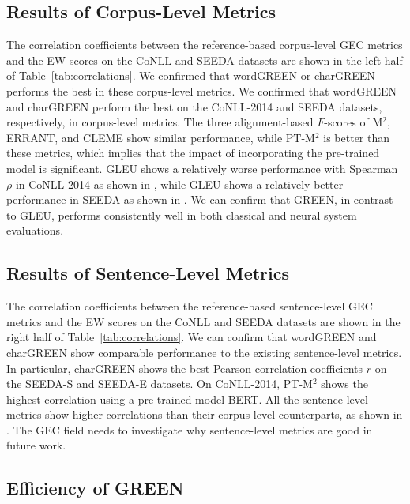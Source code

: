 \documentclass[11pt]{article}
\begin{document}
\subsection{Results of Corpus-Level Metrics}
\label{sec:corpus_level_evaluation}

The correlation coefficients between the reference-based corpus-level GEC metrics and the EW scores on the CoNLL and SEEDA datasets are shown in the left half of Table~\ref{tab:correlations}.
We confirmed that wordGREEN or charGREEN performs the best in these corpus-level metrics.
We confirmed that wordGREEN and charGREEN perform the best on the CoNLL-2014 and SEEDA datasets, respectively, in corpus-level metrics.
The three alignment-based $F$-scores of M${}^2$, ERRANT, and CLEME show similar performance, while PT-M${}^2$ is better than these metrics, which implies that the impact of incorporating the pre-trained model is significant.
GLEU shows a relatively worse performance with Spearman $\rho$ in CoNLL-2014 as shown in \citet{chollampatt-ng-2018-reassessment}, while GLEU shows a relatively better performance in SEEDA as shown in \citet{10.1162/tacl_a_00676}.
We can confirm that GREEN, in contrast to GLEU, performs consistently well in both classical and neural system evaluations.

\subsection{Results of Sentence-Level Metrics}
\label{sec:sentence_level_evaluation}

The correlation coefficients between the reference-based sentence-level GEC metrics and the EW scores on the CoNLL and SEEDA datasets are shown in the right half of Table~\ref{tab:correlations}.
We can confirm that wordGREEN and charGREEN show comparable performance to the existing sentence-level metrics.
In particular, charGREEN shows the best Pearson correlation coefficients $r$ on the SEEDA-S and SEEDA-E datasets.
On CoNLL-2014, PT-M${}^2$ shows the highest correlation using a pre-trained model BERT.
All the sentence-level metrics show higher correlations than their corpus-level counterparts, as shown in \citet{napoles-etal-2016-theres}.
The GEC field needs to investigate why sentence-level metrics are good in future work.

\subsection{Efficiency of GREEN}
\label{sec:speed}
\end{document}
